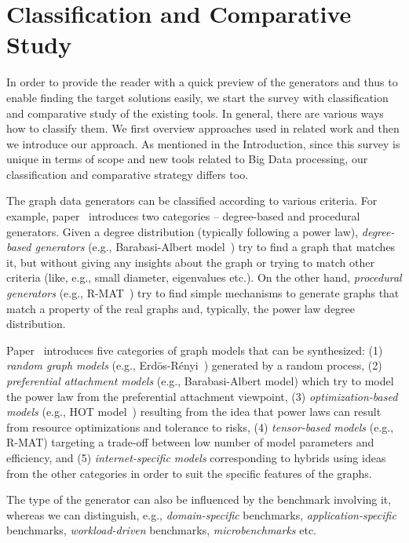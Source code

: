 \section{Classification and Comparative Study}
\label{sec:comparison}

In order to provide the reader with a quick preview of the generators and thus to enable finding the target solutions easily, we start the survey with classification and comparative study of the existing tools. In general, there are various ways how to classify them. We first overview approaches used in related work and then we introduce our approach. As mentioned in the Introduction, since this survey is unique in terms of scope and new tools related to Big Data processing, our classification and comparative strategy differs too.

The graph data generators can be classified according to various criteria. For example, paper~\cite{DBLP:conf/sdm/ChakrabartiZF04} introduces two categories -- degree-based and procedural generators. Given a degree distribution (typically following a power law), \emph{degree-based generators} (e.g., Barabasi-Albert model~\cite{Barabasi99emergenceScaling}) try to find a graph that matches it, but without giving any insights about the graph or trying to match other criteria (like, e.g., small diameter, eigenvalues etc.). On the other hand, \emph{procedural generators} (e.g., R-MAT~\cite{DBLP:conf/sdm/ChakrabartiZF04}) try to find simple mechanisms to generate graphs that match a property of the real graphs and, typically, the power law degree distribution.

Paper~\cite{Chakrabarti:2006:GML:1132952.1132954} introduces five categories of graph models that can be synthesized: (1) \emph{random graph models} (e.g., Erd\"{o}s-R\'{e}nyi~\cite{Erdos:1960}) generated by a random process, (2) \emph{preferential attachment models} (e.g., Barabasi-Albert model) which try to model the power law from the preferential attachment viewpoint, (3) \emph{optimization-based models} (e.g., HOT model~\cite{PhysRevLett.84.2529}) resulting from the idea that power laws can result from resource optimizations and tolerance to risks, (4) \emph{tensor-based models} (e.g., R-MAT) targeting a trade-off between low number of model parameters and efficiency, and (5) \emph{internet-specific models} corresponding to hybrids using ideas from the other categories in order to suit the specific features of the graphs.

The type of the generator can also be influenced by the benchmark involving it, whereas we can distinguish, e.g., \emph{domain-specific} benchmarks, \emph{application-specific} benchmarks, \emph{workload-driven} benchmarks,  \emph{microbenchmarks} etc.


